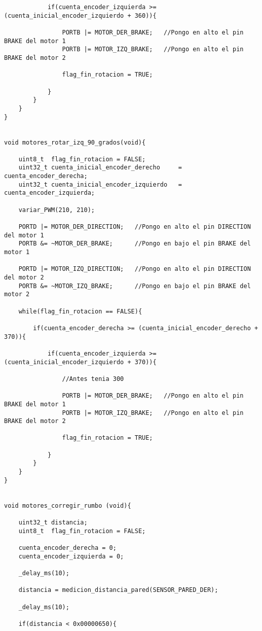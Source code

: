 \documentclass[a4paper,12pt]{article}   %
\begin{document}
\begin{lstlisting}
            if(cuenta_encoder_izquierda >= (cuenta_inicial_encoder_izquierdo + 360)){

                PORTB |= MOTOR_DER_BRAKE;	//Pongo en alto el pin BRAKE del motor 1
                PORTB |= MOTOR_IZQ_BRAKE;	//Pongo en alto el pin BRAKE del motor 2

                flag_fin_rotacion = TRUE;

            }
        }
    }
}


void motores_rotar_izq_90_grados(void){

    uint8_t  flag_fin_rotacion = FALSE;
    uint32_t cuenta_inicial_encoder_derecho     =   cuenta_encoder_derecha;
    uint32_t cuenta_inicial_encoder_izquierdo   =   cuenta_encoder_izquierda;

    variar_PWM(210, 210);

    PORTD |= MOTOR_DER_DIRECTION; 	//Pongo en alto el pin DIRECTION del motor 1
    PORTB &= ~MOTOR_DER_BRAKE;	    //Pongo en bajo el pin BRAKE del motor 1

    PORTD |= MOTOR_IZQ_DIRECTION; 	//Pongo en alto el pin DIRECTION del motor 2
    PORTB &= ~MOTOR_IZQ_BRAKE;	    //Pongo en bajo el pin BRAKE del motor 2

    while(flag_fin_rotacion == FALSE){

        if(cuenta_encoder_derecha >= (cuenta_inicial_encoder_derecho + 370)){

            if(cuenta_encoder_izquierda >= (cuenta_inicial_encoder_izquierdo + 370)){

                //Antes tenia 300

                PORTB |= MOTOR_DER_BRAKE;	//Pongo en alto el pin BRAKE del motor 1
                PORTB |= MOTOR_IZQ_BRAKE;	//Pongo en alto el pin BRAKE del motor 2

                flag_fin_rotacion = TRUE;

            }
        }
    }
}


void motores_corregir_rumbo (void){

    uint32_t distancia;
    uint8_t  flag_fin_rotacion = FALSE;

    cuenta_encoder_derecha = 0;
    cuenta_encoder_izquierda = 0;

    _delay_ms(10);

    distancia = medicion_distancia_pared(SENSOR_PARED_DER);

    _delay_ms(10);

    if(distancia < 0x00000650){


\end{lstlisting}
\end{document}
